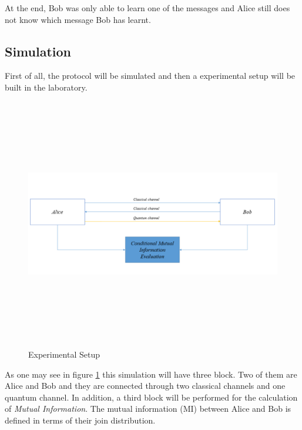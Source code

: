 At the end, Bob was only able to learn one of the messages and Alice still does not know which message Bob has learnt.

\subsection{Simulation}

First of all, the protocol will be simulated and then a experimental setup will be built in the laboratory.

\begin{figure}[H]
	\centering
	\includegraphics[width=1.0\textwidth, height=11cm]{./sdf/ot_with_discrete_variables/figures/SetupOt.png}
	\caption{Experimental Setup}\label{experimentalsetup}
\end{figure}

As one may see in figure \ref{experimentalsetup} this simulation will have three block. Two of them are Alice and Bob and they are connected through two classical channels and one quantum channel. In addition, a third block will be performed for the calculation of \textit{Mutual Information}. The mutual information (MI) between Alice and Bob is defined in terms of their join distribution.

